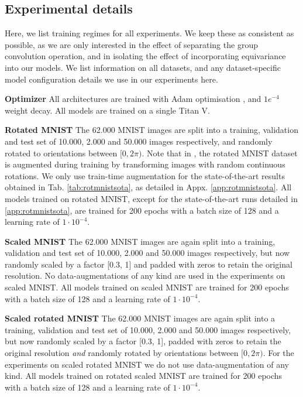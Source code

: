 \documentclass[nohyperref]{article}
\theoremstyle{plain}
\theoremstyle{definition}
\theoremstyle{remark}
\begin{document}
\subsection{Experimental details}
\label{app:trainingregimes}
Here, we list training regimes for all experiments. We keep these as consistent as possible, as we are only interested in the effect of separating the group convolution operation, and in isolating the effect of incorporating equivariance into our models. We list information on all datasets, and any dataset-specific model configuration details we use in our experiments here.

\textbf{Optimizer} All architectures are trained with Adam optimisation \citep{kingma2014adam}, and  $1e^{-4}$ weight decay. All models are trained on a single Titan V.

\textbf{Rotated MNIST} The 62.000 MNIST images \citep{lecun1998gradient} are split into a training, validation and test set of 10.000, 2.000 and 50.000 images respectively, and randomly rotated to orientations between $[0, 2\pi)$. Note that in \citep{weiler2018learning, weiler2019general}, the rotated MNIST dataset is augmented during training by transforming images with random continuous rotations. We only use train-time augmentation for the state-of-the-art results obtained in Tab. \ref{tab:rotmnistsota}, as detailed in Appx. \ref{app:rotmnistsota}. All models trained on rotated MNIST, except for the state-of-the-art runs detailed in \ref{app:rotmnistsota}, are trained for 200 epochs with a batch size of 128 and a learning rate of $1 \cdot 10^{-4}$.

\textbf{Scaled MNIST} The 62.000 MNIST images are again split into a training, validation and test set of 10.000, 2.000 and 50.000 images respectively, but now randomly scaled by a factor [0.3, 1] and padded with zeros to retain the original resolution. No data-augmentations of any kind are used in the experiments on scaled MNIST. All models trained on scaled MNIST are trained for 200 epochs with a batch size of 128 and a learning rate of $1 \cdot 10^{-4}$. 

\textbf{Scaled rotated MNIST} The 62.000 MNIST images are again split into a training, validation and test set of 10.000, 2.000 and 50.000 images respectively, but now randomly scaled by a factor [0.3, 1],  padded with zeros to retain the original resolution \textit{and} randomly rotated by orientations between $[0, 2\pi)$. For the experiments on scaled rotated MNIST we do not use data-augmentation of any kind. All models trained on rotated scaled MNIST are trained for 200 epochs with a batch size of 128 and a learning rate of $1 \cdot 10^{-4}$. 
\end{document}
